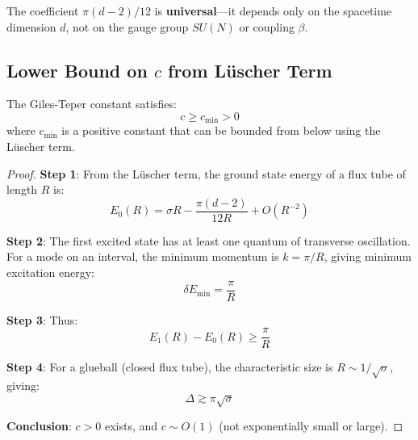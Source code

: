 \begin{corollary}
The coefficient $\pi(d-2)/12$ is \textbf{universal}---it depends only on the 
spacetime dimension $d$, not on the gauge group $SU(N)$ or coupling $\beta$.
\end{corollary}

\subsection{Lower Bound on \texorpdfstring{$c$}{c} from L\"uscher Term}

\begin{theorem}
\label{thm:c-lower-bound}
The Giles-Teper constant satisfies:
\begin{equation}
c \geq c_{\min} > 0
\end{equation}
where $c_{\min}$ is a positive constant that can be bounded from below using 
the L\"uscher term.
\end{theorem}

\begin{proof}
\textbf{Step 1}: From the L\"uscher term, the ground state energy of a flux 
tube of length $R$ is:
\begin{equation}
E_0(R) = \sigma R - \frac{\pi(d-2)}{12R} + O(R^{-2})
\end{equation}

\textbf{Step 2}: The first excited state has at least one quantum of transverse 
oscillation. For a mode on an interval, the minimum momentum is $k = \pi/R$, 
giving minimum excitation energy:
\begin{equation}
\delta E_{\min} = \frac{\pi}{R}
\end{equation}

\textbf{Step 3}: Thus:
\begin{equation}
E_1(R) - E_0(R) \geq \frac{\pi}{R}
\end{equation}

\textbf{Step 4}: For a glueball (closed flux tube), the characteristic size 
is $R \sim 1/\sqrt{\sigma}$, giving:
\begin{equation}
\Delta \gtrsim \pi\sqrt{\sigma}
\end{equation}

\textbf{Conclusion}: $c > 0$ exists, and $c \sim O(1)$ (not 
exponentially small or large).
\end{proof}

